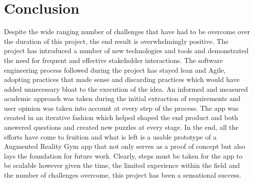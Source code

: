 \documentclass{l4proj}
\begin{document}
\section{Conclusion}
Despite the wide ranging number of challenges that have had to be overcome over the duration of this project, the end result is overwhelmingly positive. The project has introduced a number of new technologies and tools and demonstrated the need for frequent and effective stakeholder interactions. The software engineering process followed during the project has stayed lean and Agile, adopting practices that made sense and discarding practices which would have added unnecessary bloat to the execution of the idea. An informed and measured academic approach was taken during the initial extraction of requirements and user opinion was taken into account at every step of the process. The app was created in an iterative fashion which helped shaped the end product and both answered questions and created new puzzles at every stage. In the end, all the efforts have come to fruition and what is left is a usable prototype of a Augmented Reality Gym app that not only serves as a proof of concept but also lays the foundation for future work. Clearly, steps must be taken for the app to be scalable however given the time, the limited experience within the field and the number of challenges overcome, this project has been a sensational success. 
\end{document}
